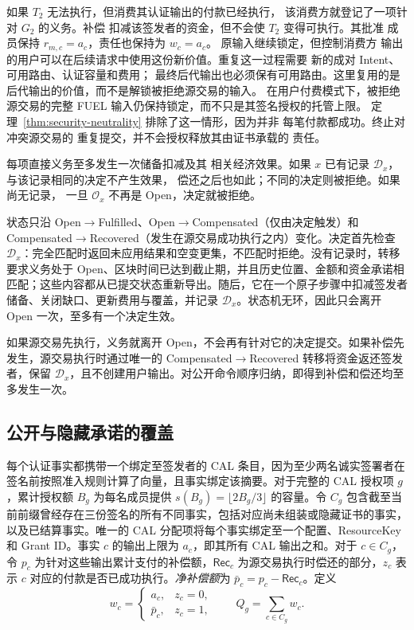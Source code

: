 如果 $T_2$ 无法执行，但消费其认证输出的付款已经执行，
该消费方就登记了一项针对 $G_2$ 的义务。补偿
扣减该签发者的资金，但不会使 $T_2$ 变得可执行。其批准
成员保持 $r_{m,c}=a_c$，责任也保持为 $w_c=a_c$。
原输入继续锁定，但控制消费方
输出的用户可以在后续请求中使用这份新价值。重复这一过程需要
新的成对 Intent、可用路由、认证容量和费用；
最终后代输出也必须保有可用路由。这里复用的是
后代输出的价值，而不是解锁被拒绝源交易的输入。
在用户付费模式下，被拒绝源交易的完整
FUEL 输入仍保持锁定，而不只是其签名授权的托管上限。
定理~\ref{thm:security-neutrality} 排除了这一情形，因为并非
每笔付款都成功。终止对冲突源交易的
重复提交，并不会授权释放其由证书承载的
责任。

\begin{lemma}[补偿至多生效一次]
\label{lem:security-decision}
每项直接义务至多发生一次储备扣减及其
相关经济效果。如果 $x$ 已有记录
$\mathcal D_x$，与该记录相同的决定不产生效果，
偿还之后也如此；不同的决定则被拒绝。如果尚无记录，
一旦 $\mathcal O_x$ 不再是 Open，决定就被拒绝。
\end{lemma}
\begin{IEEEproof}
状态只沿 Open$\to$Fulfilled、Open$\to$Compensated（仅由决定触发）和 Compensated$\to$Recovered（发生在源交易成功执行之内）变化。决定首先检查 $\mathcal D_x$：完全匹配时返回未应用结果和空变更集，不匹配时拒绝。没有记录时，转移要求义务处于 Open、区块时间已达到截止期，并且历史位置、金额和资金承诺相匹配；这些内容都从已提交状态重新导出。随后，它在一个原子步骤中扣减签发者储备、关闭缺口、更新费用与覆盖，并记录 $\mathcal D_x$。状态机无环，因此只会离开 Open 一次，至多有一个决定生效。

如果源交易先执行，义务就离开 Open，不会再有针对它的决定提交。如果补偿先发生，源交易执行时通过唯一的 Compensated$\to$Recovered 转移将资金返还签发者，保留 $\mathcal D_x$，且不创建用户输出。对公开命令顺序归纳，即得到补偿和偿还均至多发生一次。
\end{IEEEproof}

\subsection{公开与隐藏承诺的覆盖}
\label{sec:security-coverage}

每个认证事实都携带一个绑定至签发者的 CAL 条目，因为至少两名诚实签署者在签名前按照准入规则计算了向量，且事实绑定该摘要。对于完整的 CAL 授权项 $g$，累计授权额 $B_g$ 为每名成员提供 $s(B_g)=\lfloor2B_g/3\rfloor$ 的容量。令 $C_g$ 包含截至当前前缀曾经存在三份签名的所有不同事实，包括对应尚未组装或隐藏证书的事实，以及已结算事实。唯一的 CAL 分配项将每个事实绑定至一个配置、ResourceKey 和 Grant ID。事实 $c$ 的输出上限为 $a_c$，即其所有 CAL 输出之和。对于 $c\in C_g$，令 $p_c$ 为针对这些输出累计支付的补偿额，$\mathsf{Rec}_c$ 为源交易执行时偿还的部分，$z_c$ 表示 $c$ 对应的付款是否已成功执行。\emph{净补偿额}为 $\bar p_c=p_c-\mathsf{Rec}_c$。定义
\begin{equation}
  w_c=\begin{cases}a_c,&z_c=0,\\\bar p_c,&z_c=1,\end{cases}
  \qquad Q_g=\sum_{c\in C_g}w_c.
  \label{eq:security-risk}
\end{equation}

